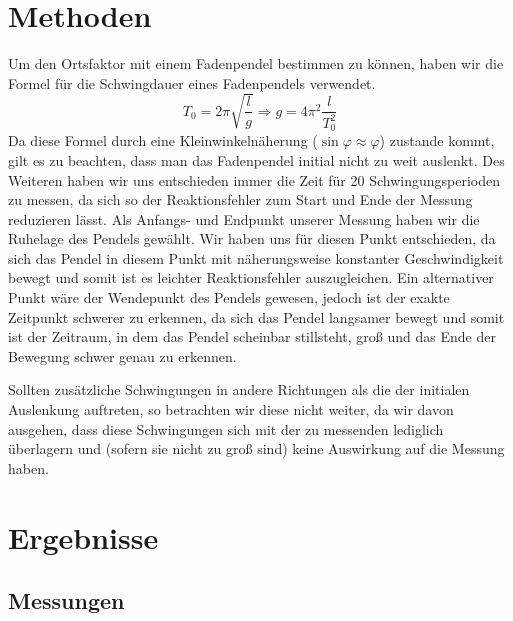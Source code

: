 \documentclass[
	a4paper,
	12pt,
	pagesize,
	ngerman
]{scrartcl}
\begin{document}
	\newpage
	\section{Methoden}
	Um den Ortsfaktor mit einem Fadenpendel bestimmen zu können, haben wir die Formel für die Schwingdauer eines Fadenpendels verwendet.
		\begin{equation}\label{eq:Ortsfaktor}
			T_0 = 2\pi \sqrt{\frac{l}{g}}
			\Rightarrow{} g = 4\pi{}^2\frac{l}{T_0^2}
		\end{equation}
	Da diese Formel durch eine Kleinwinkelnäherung (\(\sin{\varphi} \approx \varphi \)) zustande kommt, gilt es zu beachten, dass man das Fadenpendel initial nicht zu weit auslenkt. %
	Des Weiteren haben wir uns entschieden immer die Zeit für 20 Schwingungsperioden zu messen, da sich so der Reaktionsfehler zum Start und Ende der Messung reduzieren lässt.
	Als Anfangs- und Endpunkt unserer Messung haben wir die Ruhelage des Pendels gewählt. Wir haben uns für diesen Punkt entschieden, da sich das Pendel in diesem Punkt mit näherungsweise konstanter Geschwindigkeit bewegt und somit ist es leichter Reaktionsfehler auszugleichen. Ein alternativer Punkt wäre der Wendepunkt des Pendels gewesen, jedoch ist der exakte Zeitpunkt schwerer zu erkennen, da sich das Pendel langsamer bewegt und somit ist der Zeitraum, in dem das Pendel scheinbar stillsteht, groß und das Ende der Bewegung schwer genau zu erkennen.\par %
	Sollten zusätzliche Schwingungen in andere Richtungen als die der initialen Auslenkung auftreten, so betrachten wir diese nicht weiter, da wir davon ausgehen, dass diese Schwingungen sich mit der zu messenden lediglich überlagern und (sofern sie nicht zu groß sind) keine Auswirkung auf die Messung haben.  
	\newpage
	\section{Ergebnisse}
	\subsection{Messungen}
\end{document}
